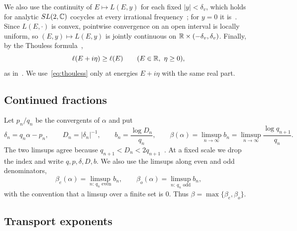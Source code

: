 We also use the continuity of $E\mapsto L(E,y)$ for each fixed $|y|<\delta_v$, which holds for analytic $SL(2,\mathbb C)$ cocycles at every irrational frequency~\cite{JKS2009,AJS2014}; for $y=0$ it is~\cite[Theorem~1]{BourgainJitomirskaya2002}. Since $L(E,\cdot)$ is convex, pointwise convergence on an open interval is locally uniform, so $(E,y)\mapsto L(E,y)$ is jointly continuous on $\mathbb R\times(-\delta_v,\delta_v)$. Finally, by the Thouless formula~\cite{CraigSimon1983},
\begin{equation}\label{eq:thouless}
\ell(E+i\eta)\ge\ell(E)\qquad(E\in\mathbb R,\ \eta\ge0),
\end{equation}
as in~\cite[proof of Lemma~5.8]{DMuniv}. We use~\eqref{eq:thouless} only at energies $E+i\eta$ with the same real part.

\subsection{Continued fractions}

Let $p_n/q_n$ be the convergents of $\alpha$ and put
\[
\delta_n=q_n\alpha-p_n,\qquad D_n=|\delta_n|^{-1},\qquad b_n=\frac{\log D_n}{q_n},\qquad \beta(\alpha)=\limsup_{n\to\infty}b_n=\limsup_{n\to\infty}\frac{\log q_{n+1}}{q_n}.
\]
The two limsups agree because $q_{n+1}<D_n<2q_{n+1}$~\cite[eq.~(5)]{DMuniv}. At a fixed scale we drop the index and write $q,p,\delta,D,b$. We also use the limsups along even and odd denominators,
\[
\beta_e(\alpha)=\limsup_{n:\,q_n\text{ even}}b_n,\qquad\beta_o(\alpha)=\limsup_{n:\,q_n\text{ odd}}b_n,
\]
with the convention that a limsup over a finite set is $0$. Thus $\beta=\max\{\beta_e,\beta_o\}$.

\subsection{Transport exponents}

